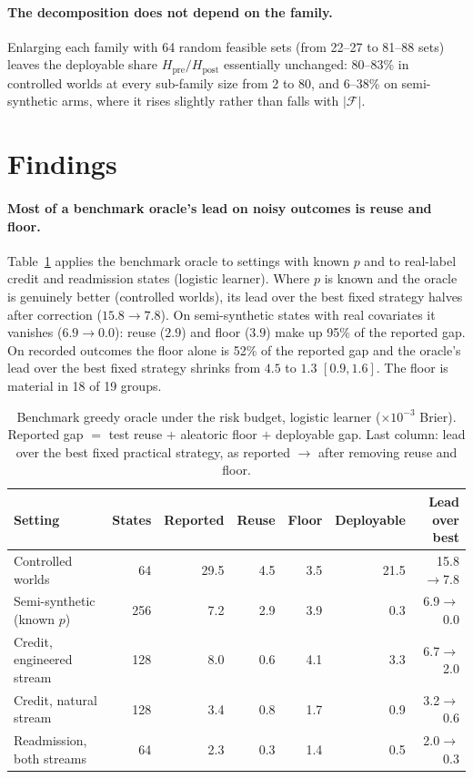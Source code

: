 \documentclass[runningheads]{llncs}
\begin{document}
\paragraph{The decomposition does not depend on the family.} Enlarging each family with 64 random feasible sets (from 22--27 to 81--88 sets) leaves the deployable share $H_{\mathrm{pre}}/H_{\mathrm{post}}$ essentially unchanged: 80--83\% in controlled worlds at every sub-family size from 2 to 80, and 6--38\% on semi-synthetic arms, where it rises slightly rather than falls with $|\mathcal F|$.

\section{Findings}
\label{sec:findings}
\paragraph{Most of a benchmark oracle's lead on noisy outcomes is reuse and floor.} Table~\ref{tab:known} applies the benchmark oracle to settings with known $p$ and to real-label credit and readmission states (logistic learner). Where $p$ is known and the oracle is genuinely better (controlled worlds), its lead over the best fixed strategy halves after correction ($15.8\to7.8$). On semi-synthetic states with real covariates it vanishes ($6.9\to0.0$): reuse ($2.9$) and floor ($3.9$) make up 95\% of the reported gap. On recorded outcomes the floor alone is 52\% of the reported gap and the oracle's lead over the best fixed strategy shrinks from $4.5$ to $1.3$ $[0.9,1.6]$. The floor is material in 18 of 19 groups.

\begin{table}[t]
\caption{Benchmark greedy oracle under the risk budget, logistic learner ($\times10^{-3}$ Brier). Reported gap $=$ test reuse $+$ aleatoric floor $+$ deployable gap. Last column: lead over the best fixed practical strategy, as reported $\to$ after removing reuse and floor.}
\label{tab:known}
\centering\scriptsize
\setlength{\tabcolsep}{3.5pt}
\begin{tabular}{lrrrrrr}
\toprule
Setting & States & Reported & Reuse & Floor & Deployable & Lead over best \\
\midrule
Controlled worlds & 64 & 29.5 & 4.5 & 3.5 & 21.5 & 15.8$\to$7.8 \\
Semi-synthetic (known $p$) & 256 & 7.2 & 2.9 & 3.9 & 0.3 & 6.9$\to$0.0 \\
Credit, engineered stream & 128 & 8.0 & 0.6 & 4.1 & 3.3 & 6.7$\to$2.0 \\
Credit, natural stream & 128 & 3.4 & 0.8 & 1.7 & 0.9 & 3.2$\to$0.6 \\
Readmission, both streams & 64 & 2.3 & 0.3 & 1.4 & 0.5 & 2.0$\to$0.3 \\
\bottomrule
\end{tabular}
\end{table}
\end{document}
